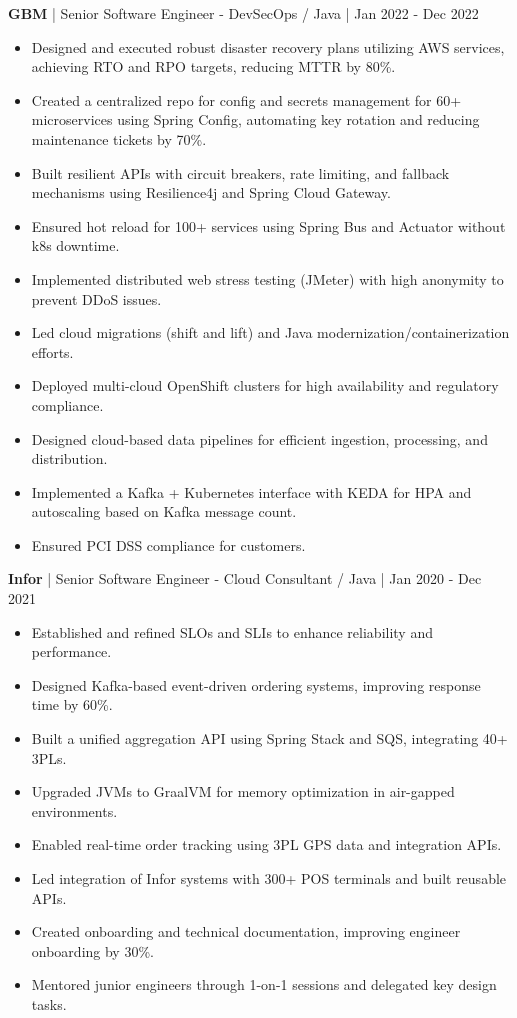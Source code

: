 \documentclass{resume} %
\begin{document}
\textbf{GBM} | Senior Software Engineer - DevSecOps / Java | Jan 2022 - Dec 2022
\begin{itemize}
    \item Designed and executed robust disaster recovery plans utilizing AWS services, achieving RTO and RPO targets, reducing MTTR by 80\%.
    \item Created a centralized repo for config and secrets management for 60+ microservices using Spring Config, automating key rotation and reducing maintenance tickets by 70\%.
    \item Built resilient APIs with circuit breakers, rate limiting, and fallback mechanisms using Resilience4j and Spring Cloud Gateway.
    \item Ensured hot reload for 100+ services using Spring Bus and Actuator without k8s downtime.
    \item Implemented distributed web stress testing (JMeter) with high anonymity to prevent DDoS issues.
    \item Led cloud migrations (shift and lift) and Java modernization/containerization efforts.
    \item Deployed multi-cloud OpenShift clusters for high availability and regulatory compliance.
    \item Designed cloud-based data pipelines for efficient ingestion, processing, and distribution.
    \item Implemented a Kafka + Kubernetes interface with KEDA for HPA and autoscaling based on Kafka message count.
    \item Ensured PCI DSS compliance for customers.
\end{itemize}


\textbf{Infor} | Senior Software Engineer - Cloud Consultant / Java | Jan 2020 - Dec 2021
\begin{itemize}
    \item Established and refined SLOs and SLIs to enhance reliability and performance.
    \item Designed Kafka-based event-driven ordering systems, improving response time by 60\%.
    \item Built a unified aggregation API using Spring Stack and SQS, integrating 40+ 3PLs.
    \item Upgraded JVMs to GraalVM for memory optimization in air-gapped environments.
    \item Enabled real-time order tracking using 3PL GPS data and integration APIs.
    \item Led integration of Infor systems with 300+ POS terminals and built reusable APIs.
    \item Created onboarding and technical documentation, improving engineer onboarding by 30\%.
    \item Mentored junior engineers through 1-on-1 sessions and delegated key design tasks.
\end{itemize}
\end{document}

